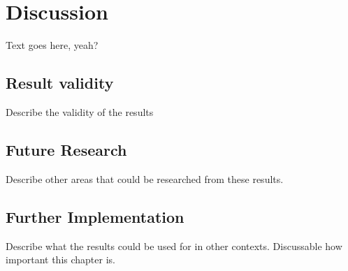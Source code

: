 \chapter{Discussion}\label{ch:discussion}
Text goes here, yeah?

\section{Result validity}\label{sec:result_validity}
Describe the validity of the results

\section{Future Research}\label{sec:future_research}
Describe other areas that could be researched from these results.

\section{Further Implementation}\label{sec:further_implementation}
Describe what the results could be used for in other contexts. Discussable how important this chapter is.